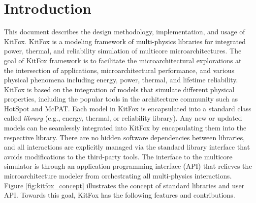 \section{Introduction} \label{sec:introduction}
\noindent
This document describes the design methodology, implementation, and usage of KitFox.
KitFox is a modeling framework of multi-physics libraries for integrated power, thermal, and reliability simulation of multicore microarchitectures.
The goal of KitFox framework is to facilitate the microarchitectural explorations at the intersection of applications, microarchitectural performance, and various physical phenomena including energy, power, thermal, and lifetime reliability.
KitFox is based on the integration of models that simulate different physical properties, including the popular tools in the architecture community such as HotSpot and McPAT.
Each model in KitFox is encapsulated into a standard class called \emph{library} (e.g., energy, thermal, or reliability library).
Any new or updated models can be seamlessly integrated into KitFox by encapsulating them into the respective library. 
There are no hidden software dependencies between libraries, and all interactions are explicitly managed via the standard library interface that avoids modifications to the third-party tools.
The interface to the multicore simulator is through an application programming interface (API) that relieves the microarchitecture modeler from orchestrating all multi-physics interactions.
Figure \ref{fig:kitfox_concept} illustrates the concept of standard libraries and user API. Towards this goal, KitFox has the following features and contributions.

